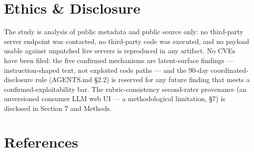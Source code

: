 \documentclass[10pt,conference]{IEEEtran}
\begin{document}
\section{Ethics \& Disclosure}

The study is analysis of public metadata and public source only: no third-party server
endpoint was contacted, no third-party code was executed, and no payload usable against
unpatched live servers is reproduced in any artifact. No CVEs have been filed: the five
confirmed mechanisms are latent-surface findings --- instruction-shaped text, not exploited
code paths --- and the 90-day coordinated-disclosure rule (AGENTS.md \S2.2) is reserved for
any future finding that meets a confirmed-exploitability bar. The rubric-consistency
second-rater provenance (an unversioned consumer LLM web UI --- a methodological
limitation, \S7) is disclosed in Section 7 and Methods.

\section*{References}
\end{document}
